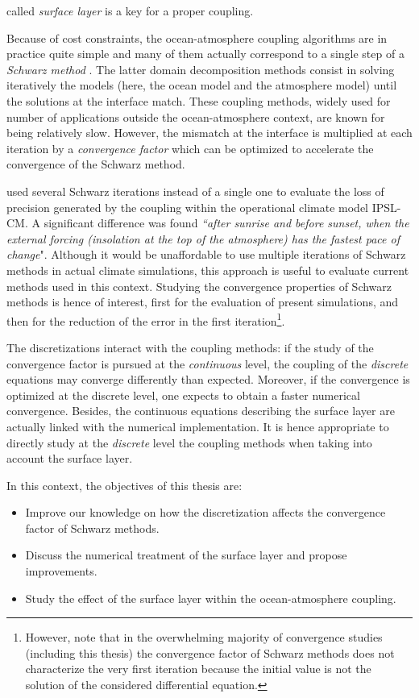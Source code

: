 called \textit{surface layer} is a key for a proper coupling.
\par %
Because of cost constraints, the ocean-atmosphere coupling algorithms
are in practice quite simple and many of them actually
correspond to a single step of a \textit{Schwarz method}
\citep{lemarie_analysis_2015}. The latter domain decomposition methods consist in solving
iteratively the models (here, the ocean model and the
atmosphere model) until the solutions at the interface match.
These coupling methods, widely used for number of applications
outside the ocean-atmosphere context, are known for being relatively
slow. However, the mismatch at the interface is multiplied
at each iteration by a \textit{convergence factor} which
can be optimized to accelerate the convergence of the
Schwarz method.
\par %
\citep{marti_schwarz_2021} used several Schwarz iterations
instead of a single one to evaluate the loss of precision
generated by the coupling within the operational climate model
IPSL-CM. A significant difference was found
\textit{``after sunrise
and before sunset, when the external forcing (insolation at
the top of the atmosphere) has the fastest pace of change}".
Although it would be unaffordable to use multiple
iterations of Schwarz methods in actual climate simulations,
this approach is useful to evaluate current methods
used in this context.
Studying the convergence properties of Schwarz methods is
hence of interest, first for the evaluation of present simulations,
and then for the reduction of the
error in the first iteration\footnote{However, note that
in the overwhelming majority of convergence studies
(including this thesis) the convergence factor of
Schwarz methods does not characterize the very first iteration
because the initial value is not the solution of the
considered differential equation.}.
\par %
The discretizations interact with the coupling methods:
if the study of the convergence factor is pursued at the
\textit{continuous} level, the coupling of the \textit{discrete}
equations may converge differently than expected. Moreover,
if the convergence is optimized at the discrete level, one expects
to obtain a faster numerical convergence.
Besides, the continuous equations describing the surface
layer are actually linked with the numerical implementation.
It is hence appropriate to directly study at the \textit{discrete}
level the coupling methods when taking into account
the surface layer.
\par %
In this context, the objectives of this thesis are:
\begin{itemize}
\item Improve our knowledge on how the discretization affects
the convergence factor of Schwarz methods.
\item Discuss the numerical treatment of the surface layer and propose
	improvements.
\item Study the effect of the surface layer within
	the ocean-atmosphere coupling.
\end{itemize}
